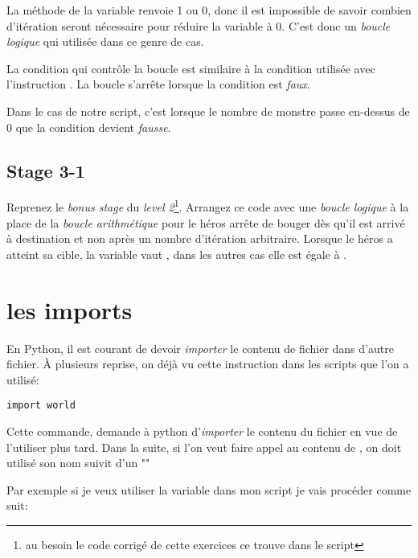 La méthode  de la variable  renvoie 1 ou 0, donc il est impossible de savoir combien d'itération seront nécessaire pour réduire la variable  à 0.
C'est donc un \emph{boucle logique} qui utilisée dans ce genre de cas.

La condition qui contrôle la boucle est similaire à la condition utilisée avec l'instruction .
La boucle s'arrête lorsque la condition est \emph{faux}.

Dans le cas de notre script, c'est lorsque le nombre de monstre passe en-dessus de 0 que la condition devient \emph{fausse}.

\subsection{Stage 3-1}

Reprenez le \textit{bonus stage} du \textit{level 2}\footnote{au besoin le code corrigé de cette exercices ce trouve dans le script }. Arrangez ce code avec une \emph{boucle logique} à la place de la \emph{boucle arithmétique} pour le héros arrête de bouger dès qu'il est arrivé à destination et non après un nombre d'itération arbitraire.
Lorsque le héros a atteint sa cible, la variable  vaut , dans les autres cas elle est égale à .

\section{les imports}

En Python, il est courant de devoir \emph{importer} le contenu de fichier dans d'autre fichier.
\`A plusieurs reprise, on déjà vu cette instruction dans les scripts que l'on a utilisé:

\begin{lstlisting}
import world
\end{lstlisting}

Cette commande, demande à python d'\emph{importer} le contenu du fichier  en vue de l'utiliser plus tard.
Dans la suite, si l'on veut faire appel au contenu de , on doit utilisé son nom suivit d'un ""

Par exemple si je veux utiliser la variable  dans mon script je vais procéder comme suit:

